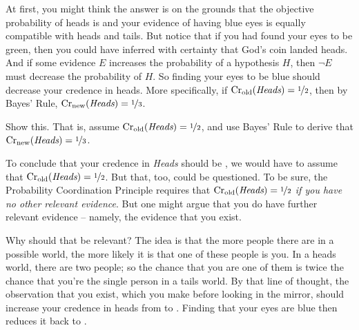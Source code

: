 At first, you might think the answer is  on the grounds
that the objective probability of heads is  and your
evidence of having blue eyes is equally compatible with heads and
tails. But notice that if you had found your eyes to be green, then
you could have inferred with certainty that God's coin landed
heads. And if some evidence $E$ increases the probability of a
hypothesis $H$, then $\neg E$ must decrease the probability of $H$. So
finding your eyes to be blue should decrease your credence in heads.
More specifically, if $\text{Cr}_\text{old}(\emph{Heads}) =
\nicefrac{1}{2}$, then by Bayes' Rule, $\text{Cr}_\text{new}(\emph{Heads}) =
\nicefrac{1}{3}$.

% 

\begin{exercise1}
  Show this. That is, assume $\text{Cr}_\text{old}(\emph{Heads}) =
  \nicefrac{1}{2}$, and use Bayes' Rule to derive that $\text{Cr}_\text{new}(\emph{Heads}) =
  \nicefrac{1}{3}$.%
\end{exercise1}

To conclude that your credence in \emph{Heads}
should be , we would have to assume that
$\text{Cr}_\text{old}(\emph{Heads}) = \nicefrac{1}{2}$. But that, too, could
be questioned. To be sure, the Probability Coordination Principle
requires that $\text{Cr}_\text{old}(\emph{Heads}) = \nicefrac{1}{2}$
\emph{if you have no other relevant evidence}. But one might argue
that you do have further relevant evidence -- namely, the evidence
that you exist.

Why should that be relevant? The idea is that the more people there
are in a possible world, the more likely it is that one of these
people is you. In a heads world, there are two people; so the chance
that you are one of them is twice the chance that you're the single
person in a tails world. By that line of thought, the observation that
you exist, which you make before looking in the mirror, should
increase your credence in heads from  to
. Finding that your eyes are blue then reduces it back to
.


